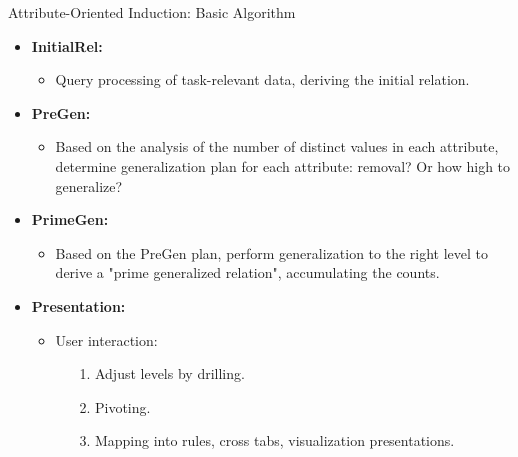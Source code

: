 \begin{frame}{Attribute-Oriented Induction: Basic Algorithm}
  \begin{itemize}
  \item \textbf{InitialRel:}
    \begin{itemize}
    \item Query processing of task-relevant data, deriving the initial relation.
    \end{itemize}
  \item \textbf{PreGen:}
    \begin{itemize}
    \item Based on the analysis of the number of distinct values in each attribute, determine generalization plan for each attribute: removal? Or how high to generalize?
    \end{itemize}
  \item \textbf{PrimeGen:}
    \begin{itemize}
    \item Based on the PreGen plan, perform generalization to the right level to derive a "prime generalized relation", accumulating the counts.
    \end{itemize}
  \item \textbf{Presentation:}
    \begin{itemize}
    \item User interaction:
      \begin{itemize}
      \item[1.] Adjust levels by drilling.
      \item[2.] Pivoting.
      \item[3.] Mapping into rules, cross tabs, visualization presentations.
      \end{itemize}
    \end{itemize}
  \end{itemize}
\end{frame}

